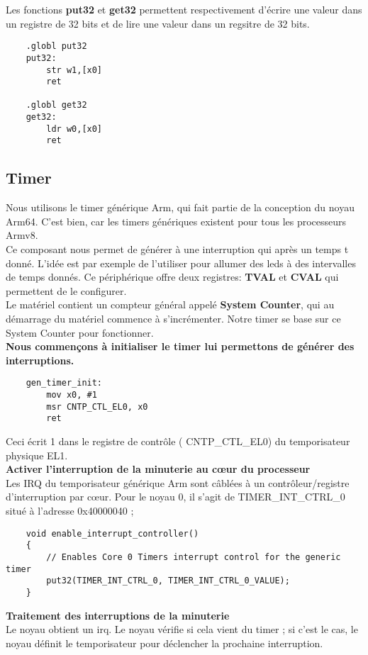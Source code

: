 \documentclass[12pt,a4paper,oneside]{book}
\begin{document}
Les fonctions \textbf{put32} et \textbf{get32} permettent respectivement d'écrire une valeur dans un registre de 32 bits et de lire une valeur dans un regsitre de 32 bits.
\begin{lstlisting}
	.globl put32
	put32:
		str w1,[x0]
		ret

	.globl get32
	get32:
		ldr w0,[x0]
		ret
\end{lstlisting}

\subsection{Timer}
Nous utilisons le timer générique Arm, qui fait partie de la conception du noyau Arm64. C'est bien, car les timers génériques existent pour tous les processeurs Armv8.\\
Ce composant nous permet de générer à une interruption qui après un temps t donné. L'idée est par exemple de l'utiliser pour allumer des leds à des intervalles de temps donnés. Ce périphérique offre deux registres: \textbf{TVAL} et \textbf{CVAL} qui permettent de le configurer.\\
Le matériel contient un compteur général appelé \textbf{System Counter}, qui au démarrage du matériel commence à s'incrémenter. Notre timer se base sur ce System Counter pour fonctionner.\\

\textbf{Nous commençons à initialiser le timer lui permettons de générer des interruptions.}\\
\begin{lstlisting}
	gen_timer_init:
		mov x0, #1
		msr CNTP_CTL_EL0, x0
		ret
\end{lstlisting}
Ceci écrit 1 dans le registre de contrôle ( CNTP\_CTL\_EL0) du temporisateur physique EL1.\\

\textbf{Activer l'interruption de la minuterie au cœur du processeur}\\
Les IRQ du temporisateur générique Arm sont câblées à un contrôleur/registre d'interruption par cœur. Pour le noyau 0, il s'agit de TIMER\_INT\_CTRL\_0 situé à l'adresse 0x40000040 ;
\begin{lstlisting}
	void enable_interrupt_controller()
	{
    	// Enables Core 0 Timers interrupt control for the generic timer 
    	put32(TIMER_INT_CTRL_0, TIMER_INT_CTRL_0_VALUE);
	}
\end{lstlisting}

\textbf{Traitement des interruptions de la minuterie}\\
Le noyau obtient un irq. Le noyau vérifie si cela vient du timer ; si c'est le cas, le noyau définit le temporisateur pour déclencher la prochaine interruption.
\end{document}
